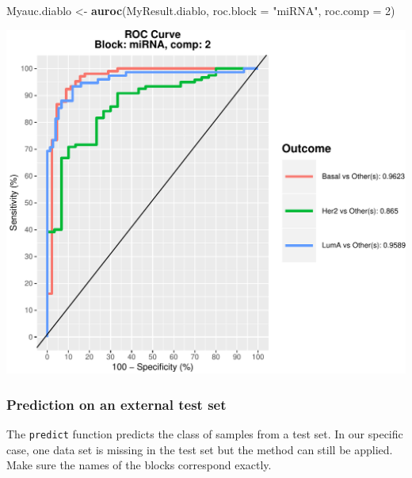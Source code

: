 \documentclass[]{book}
\newenvironment{Shaded}{\begin{snugshade}}{\end{snugshade}}
\newcommand{\CommentTok}[1]{\textcolor[rgb]{0.56,0.35,0.01}{\textit{#1}}}
\newcommand{\DataTypeTok}[1]{\textcolor[rgb]{0.13,0.29,0.53}{#1}}
\newcommand{\DecValTok}[1]{\textcolor[rgb]{0.00,0.00,0.81}{#1}}
\newcommand{\KeywordTok}[1]{\textcolor[rgb]{0.13,0.29,0.53}{\textbf{#1}}}
\newcommand{\NormalTok}[1]{#1}
\newcommand{\OperatorTok}[1]{\textcolor[rgb]{0.81,0.36,0.00}{\textbf{#1}}}
\newcommand{\StringTok}[1]{\textcolor[rgb]{0.31,0.60,0.02}{#1}}
\begin{document}
\begin{Shaded}
\begin{Highlighting}[]
\NormalTok{Myauc.diablo <-}\StringTok{ }\KeywordTok{auroc}\NormalTok{(MyResult.diablo, }\DataTypeTok{roc.block =} \StringTok{"miRNA"}\NormalTok{, }\DataTypeTok{roc.comp =} \DecValTok{2}\NormalTok{)}
\end{Highlighting}
\end{Shaded}

\begin{center}\includegraphics[width=0.5\linewidth,]{Figures/06-auroc-1} \end{center}

\hypertarget{prediction-on-an-external-test-set}{%
\subsubsection{Prediction on an external test set}\label{prediction-on-an-external-test-set}}

The \texttt{predict} function predicts the class of samples from a test set. In our specific case, one data set is missing in the test set but the method can still be applied. Make sure the names of the blocks correspond exactly.

\begin{Shaded}
\end{Shaded}
\end{document}

